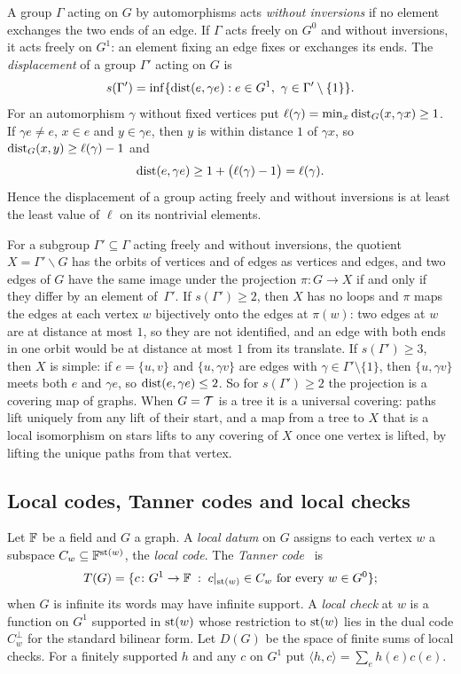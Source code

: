 A group $\Gamma$ acting on $G$ by automorphisms acts \emph{without inversions} if no element exchanges the two ends of an
edge. If $\Gamma$ acts freely on $G^0$ and without inversions, it acts freely on $G^1$: an element fixing an edge fixes
or exchanges its ends. The \emph{displacement} of a group $\Gamma'$ acting on $G$ is
\[
  s(\Gamma')=\inf\{\operatorname{dist}(e,\gamma e):e\in G^1,\ \gamma\in\Gamma'\setminus\{1\}\}.
\]
For an automorphism $\gamma$ without fixed vertices put $\ell(\gamma)=\min_x\operatorname{dist}_G(x,\gamma x)\ge1$. If $\gamma e\ne e$,
$x\in e$ and $y\in\gamma e$, then $y$ is within distance $1$ of $\gamma x$, so $\operatorname{dist}_G(x,y)\ge\ell(\gamma)-1$ and
\begin{equation}\label{eq:disp}
  \operatorname{dist}(e,\gamma e)\ge1+\bigl(\ell(\gamma)-1\bigr)=\ell(\gamma).
\end{equation}
Hence the displacement of a group acting freely and without inversions is at least the least value of $\ell$ on its
nontrivial elements.

For a subgroup $\Gamma'\subseteq\Gamma$ acting freely and without inversions, the quotient $X=\Gamma'\backslash G$ has
the orbits of vertices and of edges as vertices and edges, and two edges of $G$ have the same image under the projection
$\pi\colon G\to X$ if and only if they differ by an element of~$\Gamma'$. If $s(\Gamma')\ge2$, then $X$ has no loops
and $\pi$ maps the edges at each vertex $w$ bijectively onto the edges at $\pi(w)$: two edges at $w$ are at distance
at most $1$, so they are not identified, and an edge with both ends in one orbit would be at distance at most $1$ from
its translate. If $s(\Gamma')\ge3$, then $X$ is simple: if $e=\{u,v\}$ and $\{u,\gamma v\}$ are edges with
$\gamma\in\Gamma'\setminus\{1\}$, then $\{u,\gamma v\}$ meets both $e$ and $\gamma e$, so $\operatorname{dist}(e,\gamma e)\le2$. So for $s(\Gamma')\ge2$ the projection is a covering map of graphs.
When $G=\mathcal{T}$ is a tree it is a universal covering: paths lift uniquely from any lift of their start, and a map from a
tree to $X$ that is a local isomorphism on stars lifts to any covering of $X$ once one vertex is lifted, by lifting the
unique paths from that vertex.

\subsection{Local codes, Tanner codes and local checks}\label{sec:prelim-tanner}

Let $\mathbb{F}$ be a field and $G$ a graph. A \emph{local datum} on $G$ assigns to each vertex $w$ a subspace
$C_w\subseteq\mathbb{F}^{\operatorname{st}(w)}$, the \emph{local code}. The \emph{Tanner code}~\cite{Tanner1981} is
\[
  T(G)=\{c\colon G^1\to\mathbb{F} \;:\; c|_{\operatorname{st}(w)}\in C_w\text{ for every }w\in G^0\};
\]
when $G$ is infinite its words may have infinite support. A \emph{local check} at $w$ is a function on $G^1$ supported in
$\operatorname{st}(w)$ whose restriction to $\operatorname{st}(w)$ lies in the dual code $C_w^\perp$ for the standard bilinear form. Let $D(G)$ be the
space of finite sums of local checks. For a finitely supported $h$ and any $c$ on $G^1$ put
$\langle h,c\rangle=\sum_eh(e)c(e)$.

